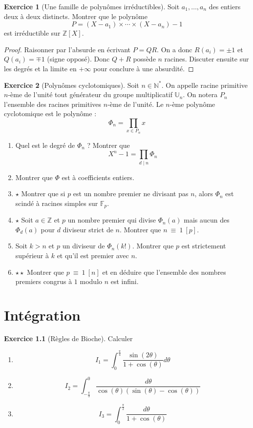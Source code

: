 \documentclass[french]{book}
\newcommand{\N}{\mathbb{N}}
\newcommand{\Z}{\mathbb{Z}}
\newcommand{\U}{\mathbb{U}}
\newcommand{\st}{^*}
\newcommand{\F}{\mathbb{F}}
\theoremstyle{definition}
\newtheorem{ex}{Exercice}[chapter]
\theoremstyle{theorem}
\theoremstyle{remark}
\begin{document}
\begin{ex}[Une famille de polynômes irréductibles]
	Soit $a_1,\ldots,a_n$ des entiers deux à deux distincts. Montrer que le polynôme $$P=(X-a_1)\times\cdots\times(X-a_n)-1$$ est irréductible sur $\Z[X]$.
\end{ex}

\begin{proof}
	Raisonner par l'absurde en écrivant $P=QR$. On a donc $R(a_i)=\pm 1$ et $Q(a_i)=\mp 1$ (signe opposé). Donc $Q+R$ possède $n$ racines. Discuter ensuite sur les degrés et la limite en $+\infty$ pour conclure à une absurdité.
\end{proof}

\begin{ex}[Polynômes cyclotomiques]
	Soit $n\in\N\st$. On appelle racine primitive $n$-ème de l'unité tout générateur du groupe multiplicatif $\U_n$. On notera $P_n$ l'ensemble des racines primitives $n$-ème de l'unité. Le $n$-ème polynôme cyclotomique est le polynôme : $$\Phi_n=\prod_{x\in P_n}x$$
	\begin{enumerate}
		\item Quel est le degré de $\Phi_n$ ? Montrer que $$X^n-1=\prod_{d\mid n}\Phi_n$$
		\item Montrer que $\Phi$ est à coefficients entiers.
		\item $\star$ Montrer que si $p$ est un nombre premier ne divisant pas $n$, alors $\Phi_n$ est scindé à racines simples sur $\F_p$. 
		\item $\star$ Soit $a\in\Z$ et $p$ un nombre premier qui divise $\Phi_n(a)$ mais aucun des $\Phi_d(a)$ pour $d$ diviseur strict de $n$. Montrer que $n\ \equiv\ 1\ [p]$.
		\item Soit $k>n$ et $p$ un diviseur de $\Phi_n(k!)$. Montrer que $p$ est strictement supérieur à $k$ et qu'il est premier avec $n$.
		\item $\star\star$ Montrer que $p\ \equiv\ 1\ [n]$ et en déduire que l'ensemble des nombres premiers congrus à $1$ modulo $n$ est infini.
	\end{enumerate}
\end{ex}

\chapter{Intégration}

\begin{ex}[Règles de Bioche]
	Calculer
	\begin{enumerate}
		\item $$I_1=\int_{0}^{\frac{\pi}{4}} \frac{\sin(2\theta)}{1+\cos(\theta)} d\theta$$
		\item $$I_2=\int_{-\frac{\pi}{3}}^{0} \frac{d\theta}{\cos(\theta)(\sin(\theta)-\cos(\theta))}$$
		\item $$I_3=\int_{0}^{\frac{\pi}{2}} \frac{d\theta}{1+\cos(\theta)}$$
	\end{enumerate}
\end{ex}
\end{document}
